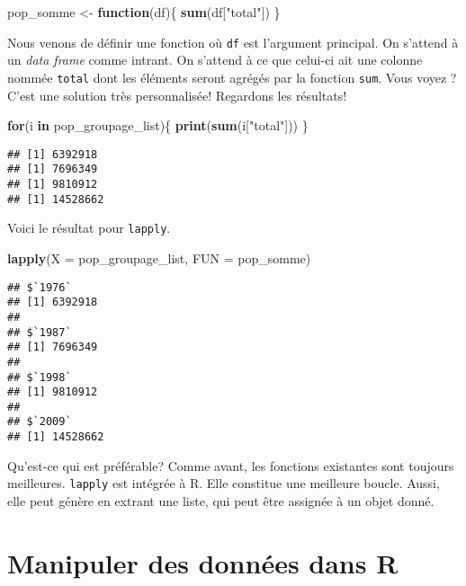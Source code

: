 \documentclass[]{book}
\newenvironment{Shaded}{\begin{snugshade}}{\end{snugshade}}
\newcommand{\KeywordTok}[1]{\textcolor[rgb]{0.13,0.29,0.53}{\textbf{#1}}}
\newcommand{\DataTypeTok}[1]{\textcolor[rgb]{0.13,0.29,0.53}{#1}}
\newcommand{\StringTok}[1]{\textcolor[rgb]{0.31,0.60,0.02}{#1}}
\newcommand{\ControlFlowTok}[1]{\textcolor[rgb]{0.13,0.29,0.53}{\textbf{#1}}}
\newcommand{\NormalTok}[1]{#1}
\begin{document}
\begin{Shaded}
\begin{Highlighting}[]
\NormalTok{pop_somme <-}\StringTok{ }\ControlFlowTok{function}\NormalTok{(df)\{}
  \KeywordTok{sum}\NormalTok{(df[}\StringTok{"total"}\NormalTok{])}
\NormalTok{  \}}
\end{Highlighting}
\end{Shaded}

Nous venons de définir une fonction où \texttt{df} est l'argument
principal. On s'attend à un \emph{data frame} comme intrant. On s'attend
à ce que celui-ci ait une colonne nommée \texttt{total} dont les
éléments seront agrégés par la fonction \texttt{sum}. Vous voyez ? C'est
une solution très personnalisée! Regardons les résultats!

\begin{Shaded}
\begin{Highlighting}[]
\ControlFlowTok{for}\NormalTok{(i }\ControlFlowTok{in}\NormalTok{ pop_groupage_list)\{}
  \KeywordTok{print}\NormalTok{(}\KeywordTok{sum}\NormalTok{(i[}\StringTok{"total"}\NormalTok{]))}
\NormalTok{\}}
\end{Highlighting}
\end{Shaded}

\begin{verbatim}
## [1] 6392918
## [1] 7696349
## [1] 9810912
## [1] 14528662
\end{verbatim}

Voici le résultat pour \texttt{lapply}.

\begin{Shaded}
\begin{Highlighting}[]
\KeywordTok{lapply}\NormalTok{(}\DataTypeTok{X =}\NormalTok{ pop_groupage_list, }\DataTypeTok{FUN =}\NormalTok{ pop_somme)}
\end{Highlighting}
\end{Shaded}

\begin{verbatim}
## $`1976`
## [1] 6392918
## 
## $`1987`
## [1] 7696349
## 
## $`1998`
## [1] 9810912
## 
## $`2009`
## [1] 14528662
\end{verbatim}

Qu'est-ce qui est préférable? Comme avant, les fonctions existantes sont
toujours meilleures. \texttt{lapply} est intégrée à R. Elle constitue
une meilleure boucle. Aussi, elle peut génère en extrant une liste, qui
peut être assignée à un objet donné.

\part{Manipuler des données dans
R}\label{part-manipuler-des-donnees-dans-r}
\end{document}

